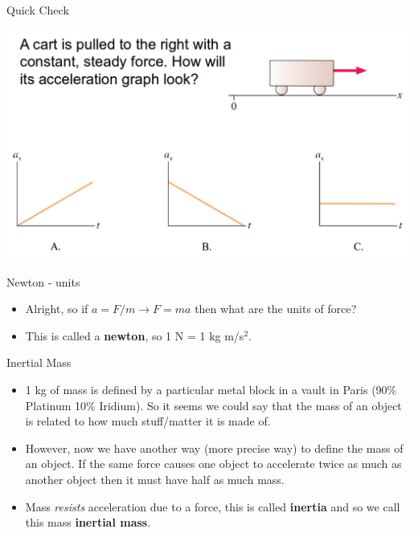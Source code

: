 \documentclass{beamer}
\newcommand{\red}[1]{{\color{red}{#1}}}
\newcommand{\checkL}[2]{\begin{textblock*}{1cm}(#1,#2){\Large \red{\Checkmark}}\end{textblock*}}
\begin{document}
\begin{frame}{Quick Check}
\begin{center}
   \includegraphics[width=\textwidth]{../figures/QC5_6.png}
\end{center}
\only<2>{\checkL{10.3cm}{7.4cm}}
\end{frame}

\begin{frame}{Newton - units}
\begin{itemize}
   \item Alright, so if $a=F/m \rightarrow F=ma$ then what are the units of force?
   \item<2-> This is called a {\bf newton}, so 1 N = 1 kg m/s$^2$.
\end{itemize}
\end{frame}

\begin{frame}{Inertial Mass}
\begin{itemize}
   \item 1 kg of mass is defined by a particular metal block in a vault in Paris (90\% Platinum 10\% Iridium). So it seems we could say that the mass of an object is related to how much stuff/matter it is made of.
   \item<2-> However, now we have another way (more precise way) to define the mass of an object. If the same force causes one object to accelerate twice as much as another object then it must have half as much mass.
   \item<3-> Mass {\it resists} acceleration due to a force, this is called {\bf inertia} and so we call this mass {\bf inertial mass}.
\end{itemize}
\end{frame}
\end{document}
